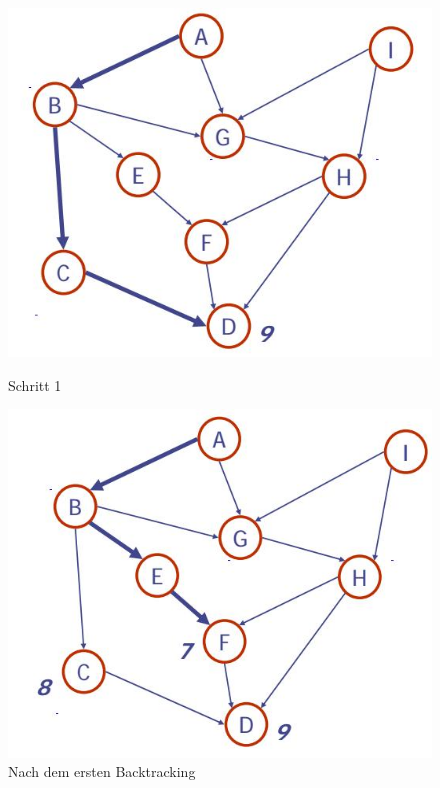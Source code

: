 \begin{figure}[ht!]
	\centering
	\begin{minipage}[t]{0.4\textwidth}
		\centering
		\includegraphics[width=\linewidth]{images/dag_topological_sort}
		\caption{Schritt 1}
		\label{fig:dagtopologicalsort}
	\end{minipage}
	\begin{minipage}[t]{0.4\textwidth}
		\centering
		\includegraphics[width=\linewidth]{images/dag_topological_sort_2}
		\caption{Nach dem ersten Backtracking}
		\label{fig:dagtopologicalsort2}
	\end{minipage}

\end{figure}
